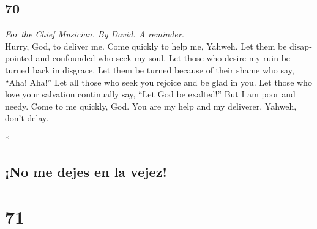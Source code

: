 \begin{paracol}{2}
\switchcolumn
\begin{otherlanguage}{english}

\hypertarget{section-139}{%
\section{70}\label{section-139}}

\emph{For the Chief Musician. By David. A reminder.}\\
 Hurry, God, to deliver me. Come quickly to help me,
Yahweh.  Let them be disappointed and confounded who seek
my soul. Let those who desire my ruin be turned back in disgrace.
 Let them be turned because of their shame who say, ``Aha!
Aha!''  Let all those who seek you rejoice and be glad in
you. Let those who love your salvation continually say, ``Let God be
exalted!''  But I am poor and needy. Come to me quickly,
God. You are my help and my deliverer. Yahweh, don't delay.

\end{otherlanguage}

\switchcolumn[0]*

\hypertarget{no-me-dejes-en-la-vejez}{%
\subsection{¡No me dejes en la vejez!}\label{no-me-dejes-en-la-vejez}}

\hypertarget{section-140}{%
\section{71}\label{section-140}}


\end{paracol}
